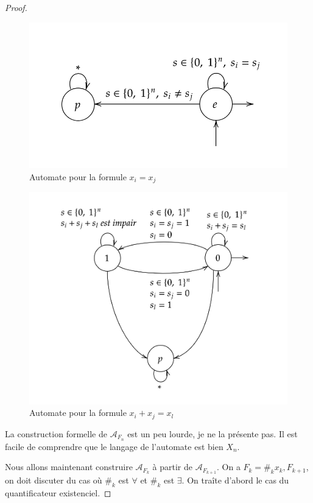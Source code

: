 \documentclass[12pt]{article}
\theoremstyle{break}
\begin{document}
\begin{proof}
  
  \begin{figure}[!h]
    \centering
    \includegraphics[scale=0.5]{auto_egalite.png}
    \caption{\label{Auto_Egalite} Automate pour la formule $x_i=x_j$}
  \end{figure}

  \begin{figure}[!h]
    \centering
    \includegraphics[scale=0.5]{auto_somme.png}
    \caption{\label{Auto_Egalite} Automate pour la formule $x_i+x_j=x_l$}
  \end{figure}

La construction formelle de $\mathcal{A}_{F_n}$ est un peu lourde, je ne la présente pas. Il est facile de comprendre que le langage de l'automate est bien $X_n$.

Nous allons maintenant construire $\mathcal{A}_{F_{k}}$ à partir de $\mathcal{A}_{F_{k+1}}$. On a $F_{k} = \#_k x_k, F_{k+1}$, on doit discuter du cas o\`u $\#_k$ est $\forall$ et $\#_k$ est $\exists$. On tra\^ite d'abord le cas du quantificateur existenciel.


\end{proof}
\end{document}
